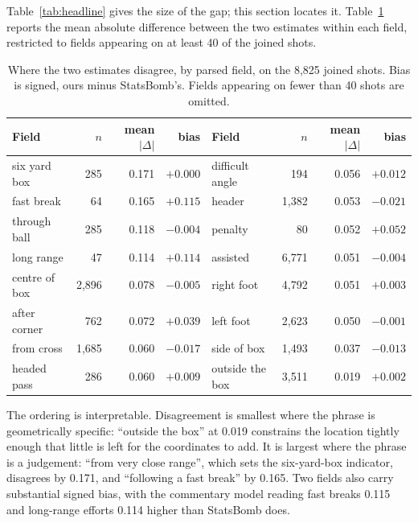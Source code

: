 \documentclass[conference]{IEEEtran}
\newcommand{\num}[1]{\mbox{#1}}
\begin{document}
Table~\ref{tab:headline} gives the size of the gap; this section locates it.
Table~\ref{tab:errors} reports the mean absolute difference between the two
estimates within each field, restricted to fields appearing on at least 40 of
the joined shots.

\begin{table}[t]
\caption{Where the two estimates disagree, by parsed field, on the
\num{8,825} joined shots. Bias is signed, ours minus StatsBomb's. Fields
appearing on fewer than 40 shots are omitted.}
\label{tab:errors}
\centering
\footnotesize
\begin{tabular}{lrrr@{\hskip 1.6em}lrrr}
\toprule
Field & $n$ & mean $|\Delta|$ & bias & Field & $n$ & mean $|\Delta|$ & bias \\
\midrule
six yard box   &  285 & \num{0.171} & $+0.000$ & difficult angle & 194 & \num{0.056} & $+0.012$ \\
fast break     &   64 & \num{0.165} & $+0.115$ & header    & \num{1,382} & \num{0.053} & $-0.021$ \\
through ball   &  285 & \num{0.118} & $-0.004$ & penalty         &  80 & \num{0.052} & $+0.052$ \\
long range     &   47 & \num{0.114} & $+0.114$ & assisted  & \num{6,771} & \num{0.051} & $-0.004$ \\
centre of box  & \num{2,896} & \num{0.078} & $-0.005$ & right foot & \num{4,792} & \num{0.051} & $+0.003$ \\
after corner   &  762 & \num{0.072} & $+0.039$ & left foot & \num{2,623} & \num{0.050} & $-0.001$ \\
from cross     & \num{1,685} & \num{0.060} & $-0.017$ & side of box & \num{1,493} & \num{0.037} & $-0.013$ \\
headed pass    &  286 & \num{0.060} & $+0.009$ & outside the box & \num{3,511} & \num{0.019} & $+0.002$ \\
\bottomrule
\end{tabular}
\end{table}

The ordering is interpretable. Disagreement is smallest where the phrase is
geometrically specific: ``outside the box'' at \num{0.019} constrains the
location tightly enough that little is left for the coordinates to add. It is
largest where the phrase is a judgement: ``from very close range'', which sets
the six-yard-box indicator, disagrees by \num{0.171}, and ``following a fast
break'' by \num{0.165}. Two fields also carry substantial signed bias, with the
commentary model reading fast breaks \num{0.115} and long-range efforts
\num{0.114} higher than StatsBomb does.
\end{document}
